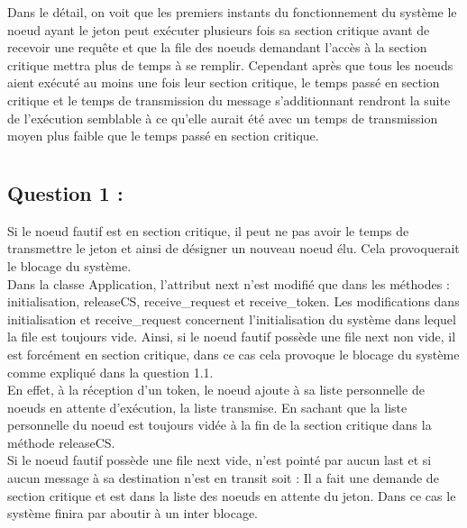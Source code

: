 \documentclass[11pt,a4paper]{report}
\begin{document}
Dans le détail, on voit que les premiers instants du fonctionnement du système le noeud ayant le jeton peut exécuter plusieurs fois sa section critique avant de recevoir une requête et que la file des noeuds demandant l'accès à la section critique mettra plus de temps à se remplir. Cependant après que tous les noeuds aient exécuté au moins une fois leur section critique, le temps passé en section critique et le temps de transmission du message s'additionnant rendront la suite de l'exécution semblable à ce qu'elle aurait été avec un temps de transmission moyen plus faible que le temps passé en section critique.\\


\chapter{}

\section{Question 1 :}

 Si le noeud fautif est en section critique, il peut ne pas avoir le temps de transmettre le jeton et ainsi de désigner un nouveau noeud élu. Cela provoquerait le blocage du système.\\

 Dans la classe Application, l'attribut next n'est modifié que dans les méthodes : initialisation, releaseCS, receive\_request et receive\_token. Les modifications dans initialisation et receive\_request concernent l'initialisation du système dans lequel la file est toujours vide. Ainsi, si le noeud fautif possède une file next non vide, il est forcément en section critique, dans ce cas cela provoque le blocage du système comme expliqué dans la question 1.1.\\

En effet, à la réception d'un token, le noeud ajoute à sa liste personnelle de noeuds en attente d'exécution, la liste transmise. En sachant que la liste personnelle du noeud est toujours vidée à la fin de la section critique dans la méthode releaseCS.\\

Si le noeud fautif possède une file next vide, n’est pointé par aucun last et si aucun message à sa destination n’est en transit soit :
 Il a fait une demande de section critique et est dans la liste des noeuds en attente du jeton. Dans ce cas le système finira par aboutir à un inter blocage.\\
\end{document}
